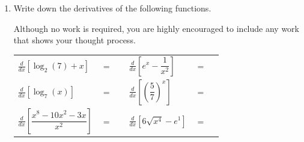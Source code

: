 \documentclass[11pt]{article}
\begin{document}
\begin{enumerate}

\newpage


\item Write down the derivatives of the following functions. 

Although no work is required, you are highly encouraged to include any work that shows your thought process. 

\begin{center}
        \begin{tabular}{l c r l c r}
            $\displaystyle\frac{d}{dx}\left[ \log_{2}(7) + x\right]$ & $=$ & \rule[-8pt]{1.5in}{0.4pt} &
            \vspace{3cm} 

            $\displaystyle\frac{d}{dx}\left[ e^x-\dfrac{1}{x^2} \right]$ & $=$ & \rule[-8pt]{1.5in}{0.4pt}\\[1in]
            \vspace{3cm} 

            $\displaystyle\frac{d}{dx}\left[ \log_7(x) \right]$ & $=$ & \rule[-8pt]{1.5in}{0.4pt}&
            $\displaystyle\frac{d}{dx}\left[ \left(\dfrac{5}{7}\right)^x \right]$ & $=$ & \rule[-8pt]{1.5in}{0.4pt}\\[1in]
            \vspace{3cm} 

            $\displaystyle\frac{d}{dx}\left[ \dfrac{x^8-10x^2 - 3x}{x^2} \right]$ & $=$ & \rule[-8pt]{1.5in}{0.4pt} & 
            $\displaystyle\frac{d}{dx}\left[ 6\sqrt{x^4}-e^1 \right]$ & $=$ & \rule[-8pt]{1.5in}{0.4pt}\\[0.3in]
        \end{tabular}
        
\end{center}



\end{enumerate}
\end{document}
